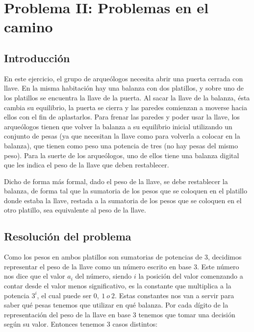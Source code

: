 \section{Problema II: Problemas en el camino}

\subsection{Introducción}

En este ejercicio, el grupo de arqueólogos necesita abrir una puerta cerrada con llave. En la misma habitación hay una balanza con dos platillos, y sobre uno de los platillos se encuentra la llave de la puerta. Al sacar la llave de la balanza, ésta cambia su equilibrio, la puerta se cierra y las paredes comienzan a moverse hacia ellos con el fin de aplastarlos. Para frenar las paredes y poder usar la llave, los arqueólogos tienen que volver la balanza a su equilibrio inicial utilizando un conjunto de pesas (ya que necesitan la llave como para volverla a colocar en la balanza), que tienen como peso una potencia de tres (no hay pesas del mismo peso). Para la suerte de los arqueólogos, uno de ellos tiene una balanza digital que les indica el peso de la llave que deben restablecer.

Dicho de forma más formal, dado el peso de la llave, se debe restablecer la balanza, de forma tal que la sumatoria de los pesos que se coloquen en el platillo donde estaba la llave, restada a la sumatoria de los pesos que se coloquen en el otro platillo, sea equivalente al peso de la llave.



\subsection{Resolución del problema}

Como los pesos en ambos platillos son sumatorias de potencias de 3, decidimos representar el peso de la llave como un número escrito en base 3. Este número nos dice que el valor $a_i$ del número, siendo $i$ la posición del valor comenzando a contar desde el valor menos significativo, es la constante que multiplica a la potencia $3^i$, el cual puede ser $0,\ 1\ o\ 2$. Estas constantes nos van a servir para saber qué pesas tenemos que utilizar en qué balanza. Por cada dígito de la representación del peso de la llave en base 3 tenemos que tomar una decisión según su valor. Entonces tenemos 3 casos distintos:

